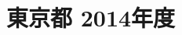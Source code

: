 \documentclass[../../hsm_tok_q.tex]{subfiles}
\begin{document}
    \section{東京都 2014年度}
    \subsection{　}
    
    \newpage
    \subsection{　}
    
    \newpage
    \subsection{　}
    
    \newpage
    \subsection{　}
    
    \newpage
    \subsection{　}
    
\end{document}
